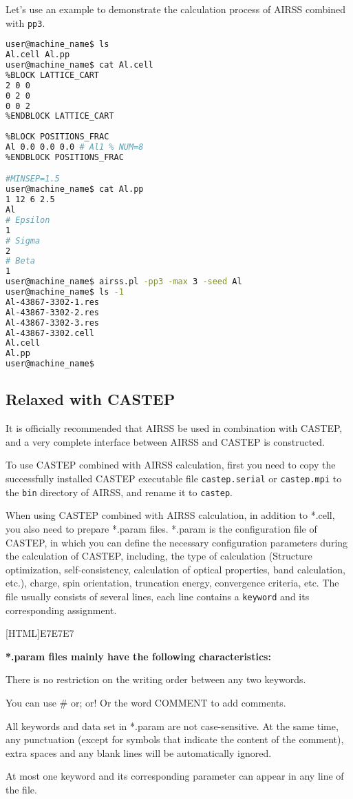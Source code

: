 \documentclass[a4paper, 10pt]{article}
\begin{document}
Let's use an example to demonstrate the calculation process of AIRSS combined with \verb|pp3|.
\begin{lstlisting}[language={bash}]
user@machine_name$ ls 
Al.cell Al.pp
user@machine_name$ cat Al.cell
%BLOCK LATTICE_CART
2 0 0
0 2 0
0 0 2 
%ENDBLOCK LATTICE_CART
 
%BLOCK POSITIONS_FRAC
Al 0.0 0.0 0.0 # Al1 % NUM=8
%ENDBLOCK POSITIONS_FRAC

#MINSEP=1.5
user@machine_name$ cat Al.pp
1 12 6 2.5
Al
# Epsilon
1
# Sigma
2
# Beta
1
user@machine_name$ airss.pl -pp3 -max 3 -seed Al
user@machine_name$ ls -1
Al-43867-3302-1.res
Al-43867-3302-2.res
Al-43867-3302-3.res
Al-43867-3302.cell
Al.cell
Al.pp
user@machine_name$
\end{lstlisting}

\subsection{Relaxed with CASTEP}
It is officially recommended that AIRSS be used in combination with CASTEP, and a very complete interface between AIRSS and CASTEP is constructed.

To use CASTEP combined with AIRSS calculation, first you need to copy the successfully installed CASTEP executable file \verb|castep.serial| or \verb|castep.mpi| to the \verb|bin| directory of AIRSS, and rename it to \verb|castep|.

When using CASTEP combined with AIRSS calculation, in addition to *.cell, you also need to prepare *.param files. *.param is the configuration file of CASTEP, in which you can define the necessary configuration parameters during the calculation of CASTEP, including, the type of calculation (Structure optimization, self-consistency, calculation of optical properties, band calculation, etc.), charge, spin orientation, truncation energy, convergence criteria, etc. The file usually consists of several lines, each line contains a \verb|keyword| and its corresponding assignment.

\noindent{}[HTML]{E7E7E7}{\parbox{\textwidth}{%
\noindent \textbf{*.param files mainly have the following characteristics:}
\begin{maineu}
\item There is no restriction on the writing order between any two keywords.
\item You can use \# or; or! Or the word COMMENT to add comments.
\item All keywords and data set in *.param are not case-sensitive. At the same time, any punctuation (except for symbols that indicate the content of the comment), extra spaces and any blank lines will be automatically ignored.
\item At most one keyword and its corresponding parameter can appear in any line of the file.
\end{maineu}}}\\
\end{document}
